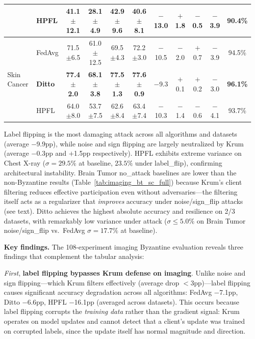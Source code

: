 \documentclass[conference]{IEEEtran}
\begin{document}
\begin{table}[htbp]
{\begin{tabular}{ll cccc cccc c}
 & HPFL & 41.1$\pm$12.1 & 28.1$\pm$4.9 & 42.9$\pm$9.6 & 40.6$\pm$8.1 & $-$13.0 & $+$1.8 & $-$0.5 & $-$3.9 & 90.4\% \\
\midrule
\multirow{3}{*}{Skin Cancer} & FedAvg & 71.5$\pm$6.5 & 61.0$\pm$12.5 & 69.5$\pm$4.3 & 72.2$\pm$3.0 & $-$10.5 & $-$2.0 & $+$0.7 & $-$3.9 & 94.5\% \\
 & \textbf{Ditto} & \textbf{77.4$\pm$2.0} & \textbf{68.1$\pm$3.8} & \textbf{77.5$\pm$1.3} & \textbf{77.6$\pm$0.9} & $-$9.3 & $+$0.1 & $+$0.2 & $-$3.0 & \textbf{96.1\%} \\
 & HPFL & 64.0$\pm$8.0 & 53.7$\pm$7.5 & 62.6$\pm$8.4 & 63.4$\pm$7.4 & $-$10.3 & $-$1.4 & $-$0.6 & $-$4.1 & 93.7\% \\
\bottomrule
\end{tabular}%
}
\par{\footnotesize Label flipping is the most damaging attack across all algorithms and datasets (average $-$9.9pp), while noise and sign flipping are largely neutralized by Krum (average $-$0.3pp and $+$1.5pp respectively). HPFL exhibits extreme variance on Chest X-ray ($\sigma{=}29.5\%$ at baseline, $23.5\%$ under label\_flip), confirming architectural instability. Brain Tumor no\_attack baselines are lower than the non-Byzantine results (Table~\ref{tab:imaging_bt_sc_full}) because Krum's client filtering reduces effective participation even without adversaries---the filtering itself acts as a regularizer that \textit{improves} accuracy under noise/sign\_flip attacks (see text). Ditto achieves the highest absolute accuracy and resilience on 2/3 datasets, with remarkably low variance under attack ($\sigma \leq 5.0\%$ on Brain Tumor noise/sign\_flip vs.\ FedAvg $\sigma{=}17.7\%$ at baseline).}
\end{table}

\textbf{Key findings.} The 108-experiment imaging Byzantine evaluation reveals three findings that complement the tabular analysis:

\textit{First}, \textbf{label flipping bypasses Krum defense on imaging}. Unlike noise and sign flipping---which Krum filters effectively (average drop $<$3pp)---label flipping causes significant accuracy degradation across all algorithms: FedAvg $-$7.1pp, Ditto $-$6.6pp, HPFL $-$16.1pp (averaged across datasets). This occurs because label flipping corrupts the \textit{training data} rather than the gradient signal: Krum operates on model updates and cannot detect that a client's update was trained on corrupted labels, since the update itself has normal magnitude and direction.
\end{document}
